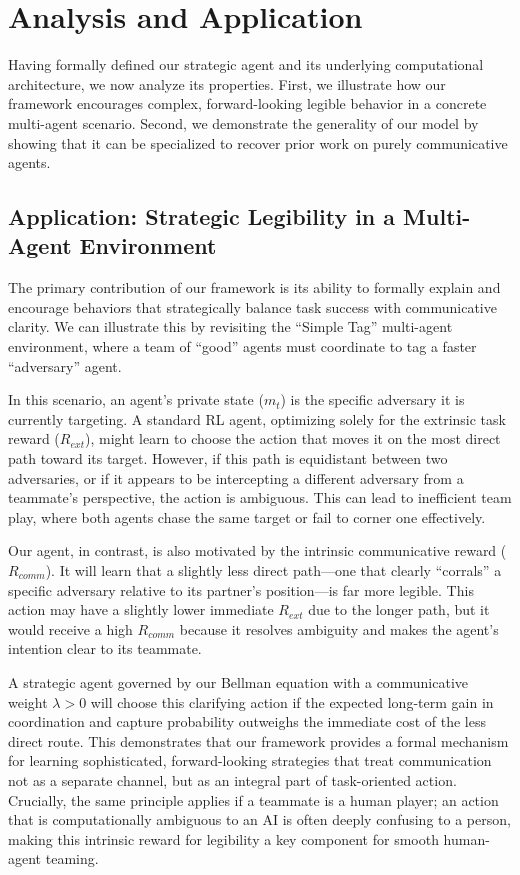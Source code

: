 \documentclass{article}
\begin{document}
\section{Analysis and Application}
\label{sec:analysis}

Having formally defined our strategic agent and its underlying computational architecture, we now analyze its properties. First, we illustrate how our framework encourages complex, forward-looking legible behavior in a concrete multi-agent scenario. Second, we demonstrate the generality of our model by showing that it can be specialized to recover prior work on purely communicative agents.

\subsection{Application: Strategic Legibility in a Multi-Agent Environment}
\label{ssec:strategic_behavior}

The primary contribution of our framework is its ability to formally explain and encourage behaviors that strategically balance task success with communicative clarity. We can illustrate this by revisiting the ``Simple Tag'' multi-agent environment, where a team of ``good'' agents must coordinate to tag a faster ``adversary'' agent.

In this scenario, an agent's private state ($m_t$) is the specific adversary it is currently targeting. A standard RL agent, optimizing solely for the extrinsic task reward ($R_{ext}$), might learn to choose the action that moves it on the most direct path toward its target. However, if this path is equidistant between two adversaries, or if it appears to be intercepting a different adversary from a teammate's perspective, the action is ambiguous. This can lead to inefficient team play, where both agents chase the same target or fail to corner one effectively.

Our agent, in contrast, is also motivated by the intrinsic communicative reward ($R_{comm}$). It will learn that a slightly less direct path—one that clearly ``corrals'' a specific adversary relative to its partner's position—is far more legible. This action may have a slightly lower immediate $R_{ext}$ due to the longer path, but it would receive a high $R_{comm}$ because it resolves ambiguity and makes the agent's intention clear to its teammate.

A strategic agent governed by our Bellman equation with a communicative weight $\lambda > 0$ will choose this clarifying action if the expected long-term gain in coordination and capture probability outweighs the immediate cost of the less direct route. This demonstrates that our framework provides a formal mechanism for learning sophisticated, forward-looking strategies that treat communication not as a separate channel, but as an integral part of task-oriented action. Crucially, the same principle applies if a teammate is a human player; an action that is computationally ambiguous to an AI is often deeply confusing to a person, making this intrinsic reward for legibility a key component for smooth human-agent teaming.
\end{document}
